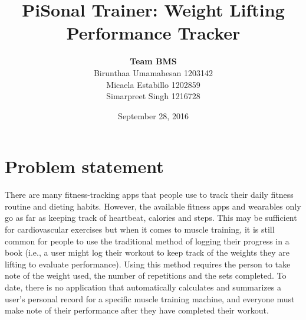 \documentclass{article}
\title{PiSonal Trainer: Weight Lifting Performance Tracker}
\author{\textbf{Team BMS} \\ Birunthaa Umamahesan 1203142 \\ Micaela Estabillo 1202859 \\ Simarpreet Singh 1216728}
\date{September 28, 2016}
\begin{document}
\maketitle

\section{Problem statement}

There are many fitness-tracking apps that people use to track their daily fitness routine and
dieting habits. However, the available fitness apps and wearables only go as far as keeping track 
of heartbeat, calories and steps. This may be sufficient for cardiovascular exercises but when it 
comes to muscle training, it is still common for people to use the traditional method of logging 
their progress in a book (i.e., a user might log their workout to keep track of the weights they 
are lifting to evaluate performance).  Using this method requires the person to take note of the 
weight used, the number of repetitions and the sets completed. To date, there is no application 
that automatically calculates and summarizes a user’s personal record for a specific muscle 
training machine, and everyone must make note of their performance after they have completed their 
workout.
\end{document}
